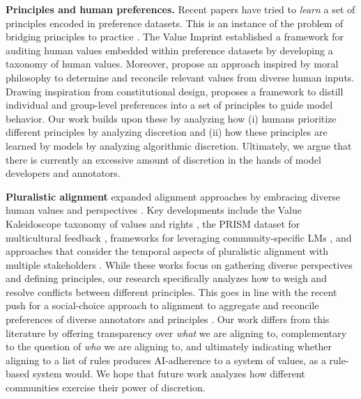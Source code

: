 \documentclass{article}
\begin{document}
\noindent \textbf{Principles and human preferences.} Recent papers have tried to \textit{learn} a set of principles encoded in preference datasets. This is an instance of the problem of bridging principles to practice \cite{davis2023affordances}. The Value Imprint \cite{obiValueImprintTechnique2024} established a framework for auditing human values embedded within preference datasets by developing a taxonomy of human values. Moreover, \cite{klingefjord2024humanvaluesalignai} propose an approach inspired by moral philosophy to determine and reconcile relevant values from diverse human inputs.  Drawing inspiration from constitutional design, \cite{findeis2024inverse} proposes a framework to distill individual and group-level preferences into a set of principles to guide model behavior. Our work builds upon these by analyzing how (i) humans prioritize different principles by analyzing discretion and (ii) how these principles are learned by models by analyzing algorithmic discretion.
Ultimately, we argue that there is currently an excessive amount of discretion in the hands of model developers and annotators.


\noindent \textbf{Pluralistic alignment} expanded alignment approaches by embracing diverse human values and perspectives \cite{sorensen2024roadmap}. Key developments include the Value Kaleidoscope taxonomy of values and rights \cite{sorensenValueKaleidoscopeEngaging2024}, the PRISM dataset for multicultural feedback \cite{kirkprism}, frameworks for leveraging community-specific LMs \cite{feng2024modular}, and approaches that consider the temporal aspects of pluralistic alignment with multiple stakeholders \cite{klassen2024pluralistic}. While these works focus on gathering diverse perspectives and defining principles, our research specifically analyzes how to weigh and resolve conflicts between different principles. This goes in line with the recent push for a social-choice approach to alignment to aggregate and reconcile preferences of diverse annotators and principles \cite{conitzer2024position}.
Our work differs from this literature by offering transparency over \textit{what} we are aligning to, complementary to the question of \textit{who} we are aligning to, and ultimately indicating whether aligning to a list of rules produces AI-adherence to a system of values, as a rule-based system would. We hope that future work analyzes how different communities exercise their power of discretion.
\end{document}

